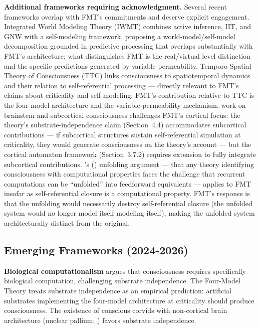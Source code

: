 \documentclass[12pt]{article}
\newcommand{\revstart}{}
\newcommand{\revend}{}
\begin{document}
{\revstart\textbf{Additional frameworks requiring acknowledgment.} Several recent frameworks overlap with FMT's commitments and deserve explicit engagement. \citet{Safron2020} Integrated World Modeling Theory (IWMT) combines active inference, IIT, and GNW with a self-modeling framework, proposing a world-model/self-model decomposition grounded in predictive processing that overlaps substantially with FMT's architecture; what distinguishes FMT is the real/virtual level distinction and the specific predictions generated by variable permeability. \citet{Northoff2020} Temporo-Spatial Theory of Consciousness (TTC) links consciousness to spatiotemporal dynamics and their relation to self-referential processing --- directly relevant to FMT's claims about criticality and self-modeling; FMT's contribution relative to TTC is the four-model architecture and the variable-permeability mechanism. \citet{Solms2021} work on brainstem and subcortical consciousness challenges FMT's cortical focus: the theory's substrate-independence claim (Section~4.4) accommodates subcortical contributions --- if subcortical structures sustain self-referential simulation at criticality, they would generate consciousness on the theory's account --- but the cortical automaton framework (Section~3.7.2) requires extension to fully integrate subcortical contributions. \citeauthor{Doerig2019}'s (\citeyear{Doerig2019}) unfolding argument --- that any theory identifying consciousness with computational properties faces the challenge that recurrent computations can be ``unfolded'' into feedforward equivalents --- applies to FMT insofar as self-referential closure is a computational property. FMT's response is that the unfolding would necessarily destroy self-referential closure (the unfolded system would no longer model itself modeling itself), making the unfolded system architecturally distinct from the original.\revend}


\subsection{Emerging Frameworks (2024-2026)}


\textbf{Biological computationalism} \citep{Milinkovic2025} argues that consciousness requires specifically biological computation, challenging substrate independence. The Four-Model Theory treats substrate independence as an empirical prediction: artificial substrates implementing the four-model architecture at criticality should produce consciousness. The existence of conscious corvids with non-cortical brain architecture (nuclear pallium; \citealp{Gunturkun2016}) favors substrate independence.
\end{document}
